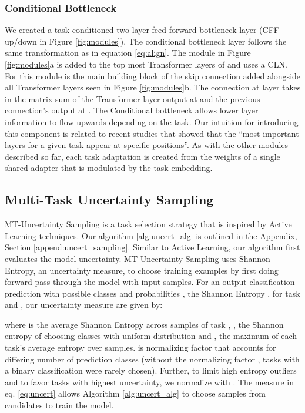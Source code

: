 \documentclass{article} \usepackage{iclr2021_conference,times}
\begin{document}
\subsubsection{Conditional Bottleneck}
\label{sec:other_adaptive_layers}
 We created a task conditioned two layer feed-forward bottleneck layer (CFF up/down in Figure \ref{fig:modules}). The conditional bottleneck layer follows the same transformation as in equation \ref{eq:align}. The module in Figure \ref{fig:modules}a  is added to the top most Transformer layers of  and uses a CLN. For   this module is the main building block of the skip connection added alongside all Transformer layers seen in Figure \ref{fig:modules}b. The connection at layer  takes in the matrix sum of the Transformer layer output at  and the previous connection's output at . The Conditional bottleneck allows lower layer information to flow upwards depending on the task. Our intuition for introducing this component is related to recent studies \citep{bert_classicnlp} that showed that the ``most important layers for a given task appear at specific positions''. As with the other modules described so far, each task adaptation is created from the weights of a single shared adapter that is modulated by the task embedding.

\subsection{Multi-Task Uncertainty Sampling}
\label{sec:uncert_samp}
MT-Uncertainty Sampling is a task selection strategy that is inspired by Active Learning techniques. Our algorithm \ref{alg:uncert_alg} is outlined in the Appendix, Section \ref{append:uncert_sampling}. Similar to Active Learning, our algorithm first evaluates the model uncertainty. MT-Uncertainty Sampling uses Shannon Entropy, an uncertainty measure, to choose training examples by first doing forward pass 
through the model with  input samples. For an output classification prediction with  possible classes and probabilities , the Shannon Entropy , for task  and , our uncertainty measure  are given by:


where  is the average Shannon Entropy across  samples of task , , the Shannon entropy of choosing classes with uniform distribution and , the maximum of each task's average entropy over  samples.  is normalizing factor that accounts for differing number of prediction classes (without the normalizing factor , tasks with a binary classification  were rarely chosen). Further, to limit high entropy outliers and to favor tasks with highest uncertainty, we normalize with . The measure in eq. \ref{eq:uncert} allows Algorithm \ref{alg:uncert_alg} to choose  samples from  candidates to train the model.
\end{document}
